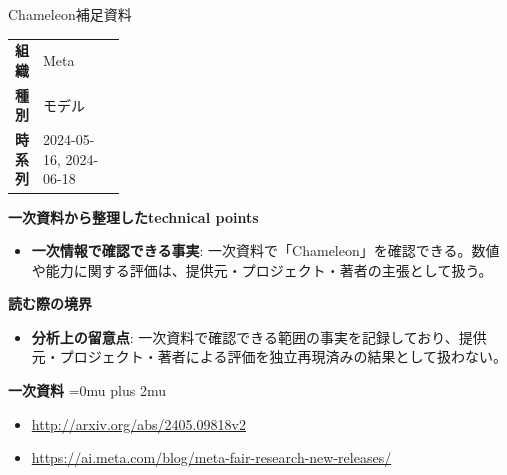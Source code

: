 \begin{technicalnote}{Chameleon}{補足資料}
\begingroup
\begin{tabularx}{\linewidth}{@{}>{\bfseries}p{0.22\linewidth}X@{}}
組織 & Meta \\
種別 & モデル \\
時系列 & 2024-05-16, 2024-06-18 \\
\end{tabularx}
\smallskip
{\bfseries 一次資料から整理したtechnical points}
\begin{itemize}[leftmargin=1.5em,itemsep=0.35em]
\item \textbf{一次情報で確認できる事実}: 一次資料で「Chameleon」を確認できる。数値や能力に関する評価は、提供元・プロジェクト・著者の主張として扱う。
\end{itemize}
\begin{minipage}{\linewidth}
{\bfseries 読む際の境界}
\begin{itemize}[leftmargin=1.5em,itemsep=0.35em]
\item \textbf{分析上の留意点}: 一次資料で確認できる範囲の事実を記録しており、提供元・プロジェクト・著者による評価を独立再現済みの結果として扱わない。
\end{itemize}
\begin{samepage}
{\bfseries 一次資料}
\begingroup\sloppy
\Urlmuskip=0mu plus 2mu\relax
\begin{itemize}[leftmargin=1.5em,itemsep=0.25em]
\item {\scriptsize\url{http://arxiv.org/abs/2405.09818v2}}
\item {\scriptsize\url{https://ai.meta.com/blog/meta-fair-research-new-releases/}}
\end{itemize}
\endgroup
\end{samepage}
\end{minipage}
\endgroup
\end{technicalnote}
\medskip
